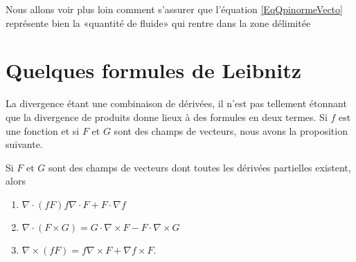 \begin{remark}
    Nous allons voir plus loin comment s'assurer que l'équation \eqref{EqQpinormeVecto} représente bien la «quantité de fluide» qui rentre dans la zone délimitée
\end{remark}

\section{Quelques formules de Leibnitz}

La divergence étant une combinaison de dérivées, il n'est pas tellement étonnant que la divergence de produits donne lieux à des formules en deux termes. Si $f$ est une fonction et si $F$ et $G$ sont des champs de vecteurs, nous avons la proposition suivante.

\begin{proposition}     \label{PROPooDMWEooNaJBCM}
    Si \( F\) et \( G\) sont des champs de vecteurs dont toutes les dérivées partielles existent, alors    
    \begin{enumerate}
        \item
            $\nabla\cdot(fF)f\nabla\cdot F+F\cdot\nabla f$
        \item
            $\nabla\cdot(F\times G)=G\cdot\nabla\times F-F\cdot\nabla\times G$
        \item       \label{ITEMooFDJIooKTnvKj}
            $\nabla\times(fF)=f\nabla\times F+\nabla f\times F$.
    \end{enumerate}
\end{proposition}

